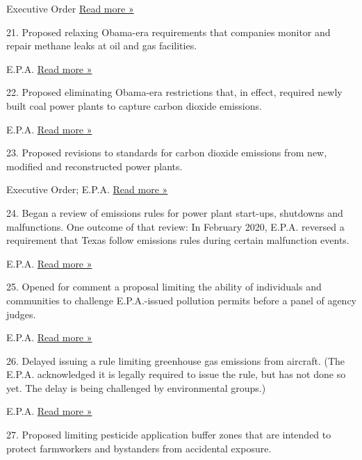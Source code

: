  Executive Order \textbar{}
\href{https://www.nytimes3xbfgragh.onion/2019/11/04/climate/trump-paris-agreement-climate.html}{Read
more »}

21. Proposed relaxing Obama-era requirements that companies monitor and
repair methane leaks at oil and gas facilities.

 E.P.A. \textbar{}
\href{https://www.nytimes3xbfgragh.onion/2019/08/29/climate/epa-methane-greenhouse-gas.html}{Read
more »}

22. Proposed eliminating Obama-era restrictions that, in effect,
required newly built coal power plants to capture carbon dioxide
emissions.

 E.P.A. \textbar{}
\href{https://www.nytimes3xbfgragh.onion/2018/12/04/climate/epa-coal-carbon-capture.html}{Read
more »}

23. Proposed revisions to standards for carbon dioxide emissions from
new, modified and reconstructed power plants.

 Executive Order; E.P.A. \textbar{}
\href{https://eelp.law.harvard.edu/2017/09/ghg-new-source-performance-standards-for-power-plants/}{Read
more »}

24. Began a review of emissions rules for power plant start-ups,
shutdowns and malfunctions. One outcome of that review: In February
2020, E.P.A. reversed a requirement that Texas follow emissions rules
during certain malfunction events.

 E.P.A. \textbar{}
\href{https://www.texasobserver.org/the-epa-told-texas-to-crack-down-on-dangerous-air-emissions-in-2015-the-state-never-did-and-now-it-wont-have-to/}{Read
more »}

25. Opened for comment a proposal limiting the ability of individuals
and communities to challenge E.P.A.-issued pollution permits before a
panel of agency judges.

 E.P.A. \textbar{}
\href{https://www.federalregister.gov/documents/2019/12/03/2019-24940/modernizing-the-administrative-exhaustion-requirement-for-permitting-decisions-and-streamlining}{Read
more »}

26. Delayed issuing a rule limiting greenhouse gas emissions from
aircraft. (The E.P.A. acknowledged it is legally required to issue the
rule, but has not done so yet. The delay is being challenged by
environmental groups.)

 E.P.A. \textbar{}
\href{https://www.eenews.net/climatewire/stories/1060417953}{Read more
»}

27. Proposed limiting pesticide application buffer zones that are
intended to protect farmworkers and bystanders from accidental exposure.

